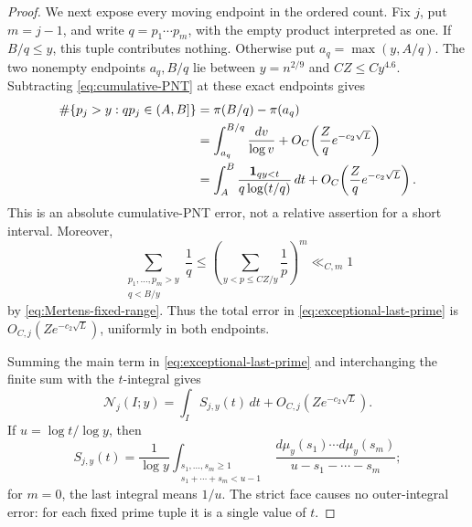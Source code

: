 \documentclass[11pt]{article}
\numberwithin{equation}{section}
\theoremstyle{definition}
\theoremstyle{remark}
\newcommand{\1}{\mathbf 1}
\begin{document}
\begin{proof}
We next expose every moving endpoint in the ordered count.  Fix \(j\),
put \(m=j-1\), and write \(q=p_1\cdots p_m\), with the empty product
interpreted as one.  If \(B/q\le y\), this tuple contributes nothing.
Otherwise put \(a_q=\max(y,A/q)\).  The two nonempty endpoints
\(a_q,B/q\) lie between \(y=n^{2/9}\) and \(CZ\le C y^{4.6}\).
Subtracting \eqref{eq:cumulative-PNT} at these exact endpoints gives
\begin{align}
 \#\{p_j>y:qp_j\in(A,B]\}
 &=\pi(B/q)-\pi(a_q)\notag\\
 &=\int_{a_q}^{B/q}\frac{dv}{\log v}
   +O_C\!\left(\frac Zq e^{-c_2\sqrt L}\right)\notag\\
 &=\int_A^B\frac{\1_{qy<t}}{q\log(t/q)}\,dt
   +O_C\!\left(\frac Zq e^{-c_2\sqrt L}\right).
 \label{eq:exceptional-last-prime}
\end{align}
This is an absolute cumulative-PNT error, not a relative assertion for a
short interval.  Moreover,
\begin{equation}
 \sum_{\substack{p_1,\ldots,p_m>y\\q<B/y}}\frac1q
 \le\left(\sum_{y<p\le CZ/y}\frac1p\right)^m
 \ll_{C,m}1
 \label{eq:rough-reciprocal-tuple-mass}
\end{equation}
by \eqref{eq:Mertens-fixed-range}.  Thus the total error in
\eqref{eq:exceptional-last-prime} is
\(O_{C,j}(Ze^{-c_2\sqrt L})\), uniformly in both endpoints.

Summing the main term in \eqref{eq:exceptional-last-prime} and
interchanging the finite sum with the \(t\)-integral gives
\begin{equation}
 \mathcal N_j(I;y)
 =\int_I S_{j,y}(t)\,dt
   +O_{C,j}(Ze^{-c_2\sqrt L}).
 \label{eq:rough-ordered-after-last-prime}
\end{equation}
If \(u=\log t/\log y\), then
\begin{equation}
 S_{j,y}(t)=\frac1{\log y}
 \int_{\substack{s_1,\ldots,s_m\ge1\\
                  s_1+\cdots+s_m<u-1}}
 \frac{d\mu_y(s_1)\cdots d\mu_y(s_m)}
      {u-s_1-\cdots-s_m};
 \label{eq:rough-exact-product-Stieltjes}
\end{equation}
for \(m=0\), the last integral means \(1/u\).  The strict face causes no
outer-integral error: for each fixed prime tuple it is a single value of
\(t\).


\end{proof}
\end{document}
